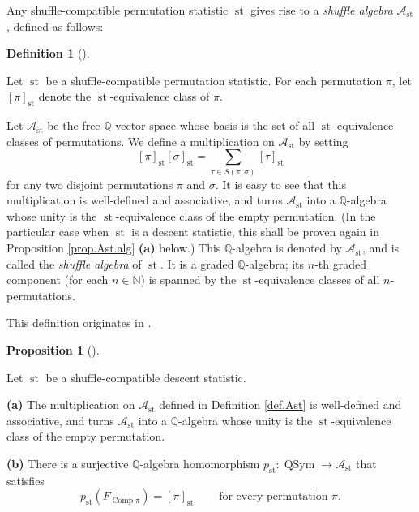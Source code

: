 \documentclass[numbers=enddot,12pt,final,onecolumn,notitlepage]{scrartcl}%
\theoremstyle{definition}
\newtheorem{prop}[theo]{Proposition}
\newenvironment{proposition}[1][]
{\begin{prop}[#1]\begin{leftbar}}
{\end{leftbar}\end{prop}}
\newtheorem{defi}[theo]{Definition}
\newenvironment{definition}[1][]
{\begin{defi}[#1]\begin{leftbar}}
{\end{leftbar}\end{defi}}
\let\sumnonlimits\sum
\renewcommand{\sum}{\sumnonlimits\limits}
\begin{document}
Any shuffle-compatible permutation statistic $\operatorname*{st}$ gives rise
to a \textit{shuffle algebra} $\mathcal{A}_{\operatorname*{st}}$, defined as follows:

\begin{definition}
\label{def.Ast}Let $\operatorname*{st}$ be a shuffle-compatible permutation
statistic. For each permutation $\pi$, let $\left[  \pi\right]
_{\operatorname*{st}}$ denote the $\operatorname*{st}$-equivalence class of
$\pi$.

Let $\mathcal{A}_{\operatorname*{st}}$ be the free $\mathbb{Q}$-vector space
whose basis is the set of all $\operatorname*{st}$-equivalence classes of
permutations. We define a multiplication on $\mathcal{A}_{\operatorname*{st}}$
by setting%
\[
\left[  \pi\right]  _{\operatorname*{st}}\left[  \sigma\right]
_{\operatorname*{st}}=\sum_{\tau\in S\left(  \pi,\sigma\right)  }\left[
\tau\right]  _{\operatorname*{st}}%
\]
for any two disjoint permutations $\pi$ and $\sigma$. It is easy to see that
this multiplication is well-defined and associative, and turns $\mathcal{A}%
_{\operatorname*{st}}$ into a $\mathbb{Q}$-algebra whose unity is the
$\operatorname*{st}$-equivalence class of the empty permutation. (In the
particular case when $\operatorname*{st}$ is a descent statistic, this shall
be proven again in Proposition \ref{prop.Ast.alg} \textbf{(a)} below.) This
$\mathbb{Q}$-algebra is denoted by $\mathcal{A}_{\operatorname*{st}}$, and is
called the \textit{shuffle algebra} of $\operatorname*{st}$. It is a graded
$\mathbb{Q}$-algebra; its $n$-th graded component (for each $n\in\mathbb{N}$)
is spanned by the $\operatorname*{st}$-equivalence classes of all $n$-permutations.
\end{definition}

This definition originates in \cite[\S 3.1]{part1}.

\begin{proposition}
\label{prop.Ast.alg}Let $\operatorname*{st}$ be a shuffle-compatible descent statistic.

\textbf{(a)} The multiplication on $\mathcal{A}_{\operatorname*{st}}$ defined
in Definition \ref{def.Ast} is well-defined and associative, and turns
$\mathcal{A}_{\operatorname*{st}}$ into a $\mathbb{Q}$-algebra whose unity is
the $\operatorname*{st}$-equivalence class of the empty permutation.

\textbf{(b)} There is a surjective $\mathbb{Q}$-algebra homomorphism
$p_{\operatorname*{st}}:\operatorname*{QSym}\rightarrow\mathcal{A}%
_{\operatorname*{st}}$ that satisfies
\[
p_{\operatorname*{st}}\left(  F_{\operatorname*{Comp}\pi}\right)  =\left[
\pi\right]  _{\operatorname*{st}}\ \ \ \ \ \ \ \ \ \ \text{for every
permutation }\pi.
\]

\end{proposition}
\end{document}
